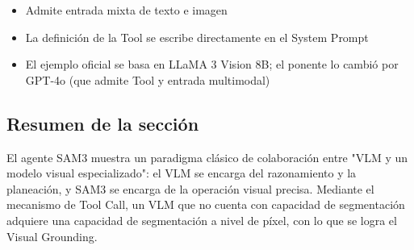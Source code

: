 \begin{itemize}
    \item Admite entrada mixta de texto e imagen
    \item La definición de la Tool se escribe directamente en el System Prompt
    \item El ejemplo oficial se basa en LLaMA 3 Vision 8B; el ponente lo cambió por GPT-4o (que admite Tool y entrada multimodal)
\end{itemize}

\subsection{Resumen de la sección}

El agente SAM3 muestra un paradigma clásico de colaboración entre "VLM y un modelo visual especializado": el VLM se encarga del razonamiento y la planeación, y SAM3 se encarga de la operación visual precisa. Mediante el mecanismo de Tool Call, un VLM que no cuenta con capacidad de segmentación adquiere una capacidad de segmentación a nivel de píxel, con lo que se logra el Visual Grounding.
